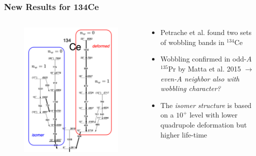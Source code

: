 \documentclass{beamer}
\begin{document}
\begin{frame}
  \frametitle{New Results for 134Ce}
\begin{columns}
  \begin{column}{0.4\textwidth}
    \begin{figure}
      \centering
      \includegraphics[scale=0.15]{Figs/triaxial-shapes-ce-134.png}
    \end{figure}
  \end{column}
  \begin{column}{0.6\textwidth}
    \begin{itemize}
      \item Petrache et al. found two sets of wobbling bands in $^{134}$Ce
      \item Wobbling confirmed in odd-$A$ $^{135}$Pr by Matta et al. 2015 $\rightarrow$ \emph{even-$A$ neighbor also with wobbling character?}
      \item The \emph{isomer structure} is based on a $10^+$ level with lower quadrupole deformation but higher life-time
    \end{itemize}
  \end{column}
\end{columns}
\end{frame}
\end{document}
